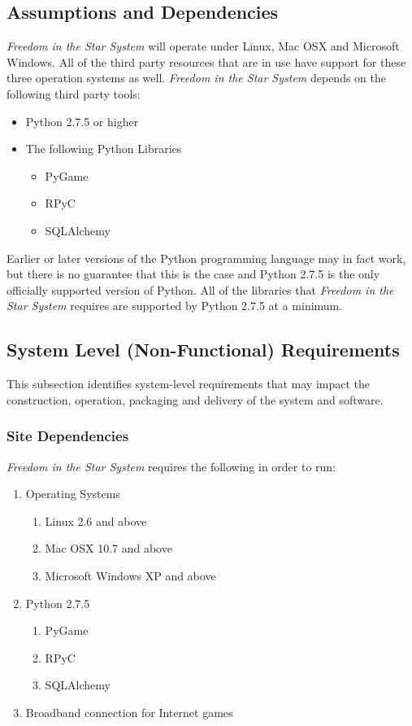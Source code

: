 \documentclass[twoside,letterpaper]{article}
\begin{document}
\subsection{Assumptions and Dependencies}
\textit{Freedom in the Star System} will operate under Linux, Mac OSX and Microsoft Windows.  All of the third party resources that are in use have support for these three operation systems as well.  \textit{Freedom in the Star System} depends on the following third party tools:
	\begin{itemize}
		\item Python 2.7.5 or higher
		\item The following Python Libraries
		\begin{itemize}
			\item PyGame
			\item RPyC
			\item SQLAlchemy
		\end{itemize}
	\end{itemize}

Earlier or later versions of the Python programming language may in fact work, but there is no guarantee that this is the case and Python 2.7.5 is the only officially supported version of Python.  All of the libraries that \textit{Freedom in the Star System} requires are supported by Python 2.7.5 at a minimum.

\subsection{System Level (Non-Functional) Requirements}
This subsection identifies system-level requirements that may impact the construction, operation, packaging and delivery of the system and software.

\subsubsection{Site Dependencies}
\textit{Freedom in the Star System} requires the following in order to run:
\begin{enumerate}
	\item Operating Systems
	\begin{enumerate}
		\item Linux 2.6 and above
		\item Mac OSX 10.7 and above
		\item Microsoft Windows XP and above
	\end{enumerate}
	\item Python 2.7.5
	\begin{enumerate}
		\item PyGame
		\item RPyC
		\item SQLAlchemy
	\end{enumerate}
	\item Broadband connection for Internet games
\end{enumerate}
\end{document}
